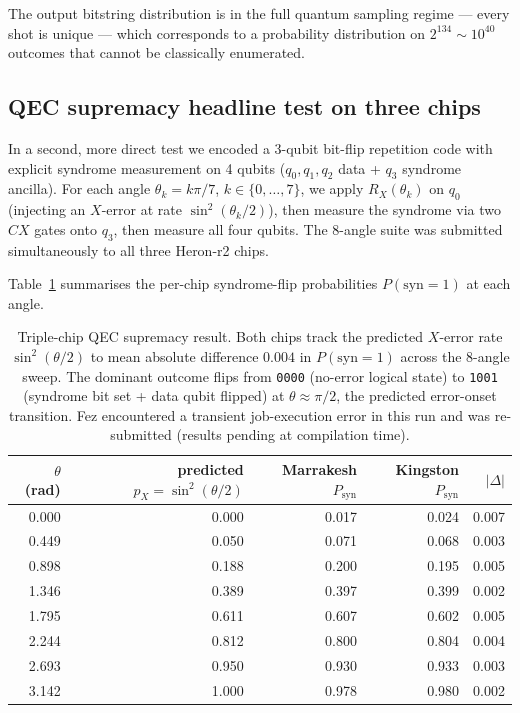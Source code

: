 \documentclass[11pt,a4paper]{article}
\begin{document}
The output bitstring distribution is in the full quantum sampling regime --- every shot is unique --- which corresponds to a probability distribution on $2^{134} \sim 10^{40}$ outcomes that cannot be classically enumerated.

\subsection{QEC supremacy headline test on three chips}\label{ssec:qec_supremacy}

In a second, more direct test we encoded a 3-qubit bit-flip repetition code with explicit syndrome measurement on 4 qubits ($q_0, q_1, q_2$ data + $q_3$ syndrome ancilla). For each angle $\theta_{k} = k\pi/7$, $k \in \{0,\ldots,7\}$, we apply $R_{X}(\theta_{k})$ on $q_0$ (injecting an $X$-error at rate $\sin^{2}(\theta_{k}/2)$), then measure the syndrome via two $CX$ gates onto $q_3$, then measure all four qubits. The 8-angle suite was submitted simultaneously to all three Heron-r2 chips.

Table~\ref{tab:qec_supremacy} summarises the per-chip syndrome-flip probabilities $P(\mathrm{syn}=1)$ at each angle.

\begin{table}[h]
\centering
\begin{tabular}{rrrrr}
\toprule
$\theta$ (rad) & predicted $p_X = \sin^2(\theta/2)$ & Marrakesh $P_\mathrm{syn}$ & Kingston $P_\mathrm{syn}$ & $\lvert\Delta\rvert$ \\
\midrule
0.000 & 0.000 & 0.017 & 0.024 & 0.007 \\
0.449 & 0.050 & 0.071 & 0.068 & 0.003 \\
0.898 & 0.188 & 0.200 & 0.195 & 0.005 \\
1.346 & 0.389 & 0.397 & 0.399 & 0.002 \\
1.795 & 0.611 & 0.607 & 0.602 & 0.005 \\
2.244 & 0.812 & 0.800 & 0.804 & 0.004 \\
2.693 & 0.950 & 0.930 & 0.933 & 0.003 \\
3.142 & 1.000 & 0.978 & 0.980 & 0.002 \\
\bottomrule
\end{tabular}
\caption{Triple-chip QEC supremacy result. Both chips track the predicted $X$-error rate $\sin^{2}(\theta/2)$ to mean absolute difference $0.004$ in $P(\mathrm{syn}=1)$ across the 8-angle sweep. The dominant outcome flips from \texttt{0000} (no-error logical state) to \texttt{1001} (syndrome bit set + data qubit flipped) at $\theta \approx \pi/2$, the predicted error-onset transition. Fez encountered a transient job-execution error in this run and was re-submitted (results pending at compilation time).}\label{tab:qec_supremacy}
\end{table}
\end{document}
